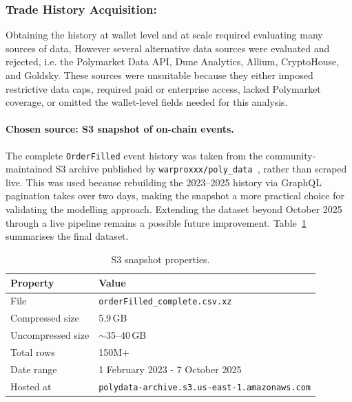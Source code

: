 \documentclass[11pt,a4paper]{article}
\begin{document}
\subsubsection*{Trade History Acquisition:}
Obtaining the history at wallet level and at scale required evaluating
many sources of data, However several alternative data sources were evaluated and rejected, i.e. the Polymarket Data API, Dune Analytics,
 Allium, CryptoHouse, and Goldsky. These sources were unsuitable because they either 
 imposed restrictive data caps, required paid or enterprise access, lacked Polymarket 
 coverage, or omitted the wallet-level fields needed for this analysis.

\paragraph{Chosen source: S3 snapshot of on-chain events.}


The complete \texttt{OrderFilled} event history was taken from the community-maintained S3 archive published by 
\texttt{warproxxx/poly\_data}~\cite{poly_data_github}, rather than scraped live. This was used because rebuilding the 
2023--2025 history via GraphQL pagination takes over two days, making the snapshot a more practical choice for 
validating the modelling approach. Extending the dataset beyond October 2025 through a live pipeline remains a possible future
 improvement. Table~\ref{tab:s3_snapshot} summarises the final dataset.

\vspace{0.6em}
\begin{table}[H]
\centering
\caption{S3 snapshot properties.}
\label{tab:s3_snapshot}
\small
\begin{tabularx}{\textwidth}{l X}
\toprule
\textbf{Property} & \textbf{Value} \\
\midrule
File                & \texttt{orderFilled\_complete.csv.xz} \\
Compressed size     & 5.9\,GB \\
Uncompressed size   & $\sim$35--40\,GB \\
Total rows          & 150M$+$ \\
Date range          & 1 February 2023 - 7 October 2025 \\
Hosted at           & \texttt{polydata-archive.s3.us-east-1.amazonaws.com} \\
\bottomrule
\end{tabularx}
\end{table}
\end{document}

